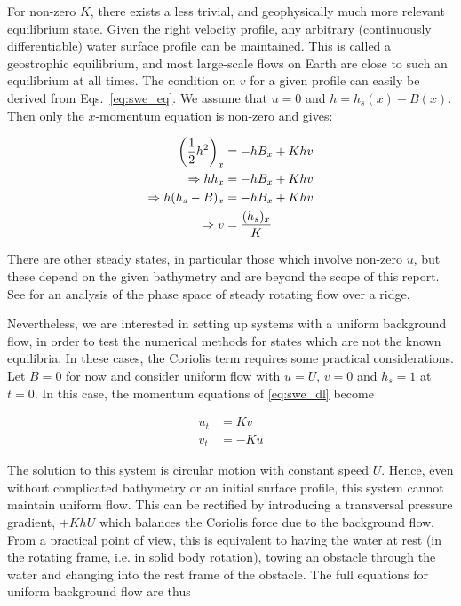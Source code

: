 For non-zero $K$, there exists a less trivial, and geophysically much more relevant equilibrium state. Given the right velocity profile, any arbitrary (continuously differentiable) water surface profile can be maintained. This is called a geostrophic equilibrium, and most large-scale flows on Earth are close to such an equilibrium at all times. The condition on $v$ for a given profile can easily be derived from Eqs.~\ref{eq:swe_eq}. We assume that $u = 0$ and $h = h_s(x) - B(x)$. Then only the $x$-momentum equation is non-zero and gives:

\begin{align}
  \qty(\frac{1}{2}h^2)_x &= -hB_x + Khv \\
  \Rightarrow h h_x &= -hB_x + Khv \\
  \Rightarrow h (h_s - B)_x &= -hB_x + Khv \\
  \Rightarrow v &= \frac{(h_s)_x}{K} \label{eq:geo_eq}
\end{align}

There are other steady states, in particular those which involve non-zero $u$, but these depend on the given bathymetry and are beyond the scope of this report. See \cite{esler2005steady} for an analysis of the phase space of steady rotating flow over a ridge.

Nevertheless, we are interested in setting up systems with a uniform background flow, in order to test the numerical methods for states which are not the known equilibria. In these cases, the Coriolis term requires some practical considerations. Let $B = 0$ for now and consider uniform flow with $u = U$, $v = 0$ and $h_s = 1$ at $t = 0$. In this case, the momentum equations of \ref{eq:swe_dl} become

\begin{align}
  u_t &= Kv \\
  v_t &= -Ku
\end{align}

The solution to this system is circular motion with constant speed $U$. Hence, even without complicated bathymetry or an initial surface profile, this system cannot maintain uniform flow. This can be rectified by introducing a transversal pressure gradient, $+KhU$ which balances the Coriolis force due to the background flow. From a practical point of view, this is equivalent to having the water at rest (in the rotating frame, i.e. in solid body rotation), towing an obstacle through the water and changing into the rest frame of the obstacle. The full equations for uniform background flow are thus

